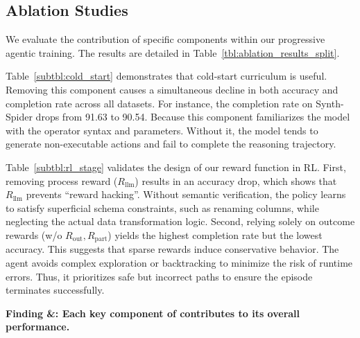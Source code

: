 \subsection{Ablation Studies}
\label{expsec: ablation_on_policy_learning}




We evaluate the contribution of specific components within our progressive agentic training. The results are detailed in Table~\ref{tbl:ablation_results_split}. 

Table~\ref{subtbl:cold_start} demonstrates that cold-start curriculum is useful. Removing this component causes a simultaneous decline in both accuracy and completion rate across all datasets. For instance, the completion rate on Synth-Spider drops from 91.63 to 90.54.
Because this component familiarizes the model with the operator syntax and parameters. Without it, the model tends to generate non-executable actions and fail to complete the reasoning trajectory. 

Table~\ref{subtbl:rl_stage} validates the design of our reward function in RL.
First, removing process reward ($R_{\text{llm}}$) results in an accuracy drop, which shows that $R_{\text{llm}}$ prevents ``reward hacking''. Without semantic verification, the policy learns to satisfy superficial schema constraints, such as renaming columns, while neglecting the actual data transformation logic.
Second, relying solely on outcome rewards (w/o $R_{\text{out}}, R_{\text{part}}$) yields the highest completion rate but the lowest accuracy.
This suggests that sparse rewards induce conservative behavior. The agent avoids complex exploration or backtracking to minimize the risk of runtime errors. Thus, it prioritizes safe but incorrect paths to ensure the episode terminates successfully.

\begin{shaded}
\noindent \textbf{Finding \findingnum \&\findingnum: Each key component of \sys contributes to its overall performance.
}
\end{shaded}
